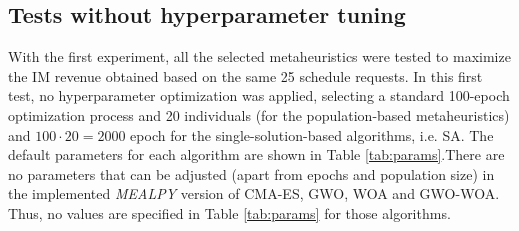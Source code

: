 \documentclass[Afour,sagev,times]{sagej}
\begin{document}
\subsection{Tests without hyperparameter tuning}
\label{sec:tests_without_hiperparameter_tunning}

With the first experiment, all the selected metaheuristics were tested to maximize the \gls{IM} revenue obtained based on the same 25 schedule requests. In this first test, no hyperparameter optimization was applied, selecting a standard 100-epoch optimization process and 20 individuals (for the population-based metaheuristics) and $ 100 \cdot 20 = 2000 $ epoch for the single-solution-based algorithms, i.e. \gls{SA}. The default parameters for each algorithm are shown in Table \ref{tab:params}.There are no parameters that can be adjusted (apart from epochs and population size) in the implemented \textit{MEALPY} version of \gls{CMA-ES}, \gls{GWO}, \gls{WOA} and \gls{GWO-WOA}. Thus, no values are specified in Table \ref{tab:params} for those algorithms.
\end{document}
